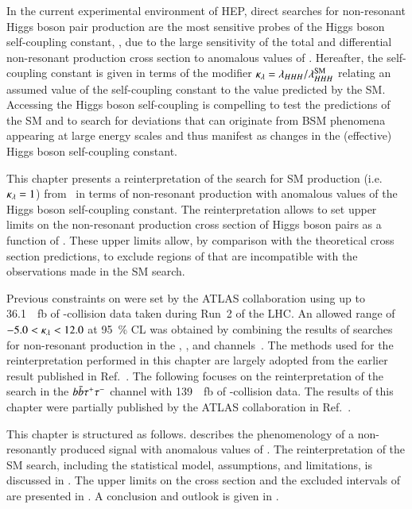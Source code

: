 In the current experimental environment of HEP, direct searches for
non-resonant Higgs boson pair production are the most sensitive probes
of the Higgs boson self-coupling constant, \lambdahhh, due to the
large sensitivity of the total and differential non-resonant \HH
production cross section to anomalous values of \lambdahhh. Hereafter,
the self-coupling constant is given in terms of the modifier
$\kappa_{\lambda} = \lambda_{HHH} / \lambda_{HHH}^{\text{SM}}$ relating an assumed
value of the self-coupling constant to the value predicted by the
SM. Accessing the Higgs boson self-coupling is compelling to test the
predictions of the SM and to search for deviations that can originate
from BSM phenomena appearing at large energy scales and thus manifest
as changes in the (effective) Higgs boson self-coupling constant.

This chapter presents a reinterpretation of the search for SM \HH
production (i.e.\ $\kappa_{\lambda} = 1$) from~ in terms of
non-resonant \HH production with anomalous values of the Higgs boson
self-coupling constant. The reinterpretation allows to set upper
limits on the non-resonant production cross section of Higgs boson
pairs as a function of \klambda. These upper limits allow, by
comparison with the theoretical cross section predictions, to exclude
regions of \klambda that are incompatible with the observations made
in the SM \HH search.

Previous constraints on \klambda were set by the ATLAS collaboration
using up to \SI{36.1}{\per\femto\barn} of \pp-collision data taken
during Run~2 of the LHC. An allowed range of $-5.0 < \kappa_{\lambda} < 12.0$
at \SI{95}{\percent} CL was obtained by combining the results of
searches for non-resonant \HH production in the \bbtautau, \bbbb, and
\bbyy channels~\cite{HDBS-2018-58}. The methods used for the
reinterpretation performed in this chapter are largely adopted from
the earlier result published in Ref.~\cite{HDBS-2018-58}. The
following focuses on the reinterpretation of the search in the
$b\bar{b}\tau^{+} \tau^{-}$ channel with \SI{139}{\per\femto\barn} of
\pp-collision data. The results of this chapter were partially
published by the ATLAS collaboration in
Ref.~\cite{ATLAS-CONF-2021-052}.

This chapter is structured as follows. 
describes the phenomenology of a non-resonantly produced \HH signal
with anomalous values of \klambda. The reinterpretation of the SM \HH
search, including the statistical model, assumptions, and limitations,
is discussed in . The upper limits on the
cross section and the excluded intervals of \klambda are presented in
. A conclusion and outlook is given
in .


